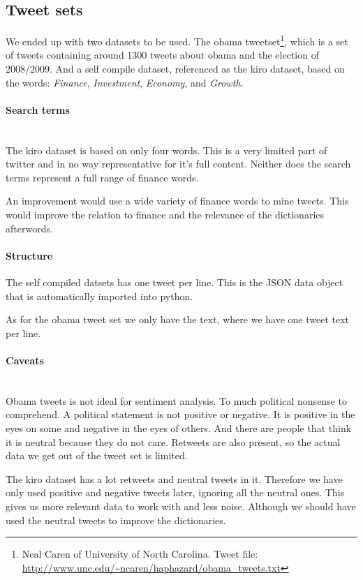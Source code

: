 \subsection{Tweet sets}
We ended up with two datasets to be used. The obama tweetset\footnote{Neal
Caren of University of North Carolina. Tweet file: \url{http://www.unc.edu/~ncaren/haphazard/obama_tweets.txt}}, which is a set of
tweets containing around 1300 tweets about obama and the election of 2008/2009.  
And a self compile dataset, referenced as the kiro dataset, based on the words: \textit{Finance},
\textit{Investment}, \textit{Economy}, and \textit{Growth}.

\paragraph{Search terms}
\hspace{0pt}\\
The kiro dataset is based on only four words. This is a very limited part of
twitter and in no way representative for it's full content. Neither does the
search terms represent a full range of finance words.

An improvement would use a wide variety of finance words to mine tweets. This
would improve the relation to finance and the relevance of the dictionaries
afterwords. 

\paragraph{Structure}
The self compiled datsets has one tweet per line. This is the JSON data object
that is automatically imported into python. 

As for the obama tweet set we only have the text, where we have one tweet text
per line. 

\paragraph{Caveats}
\hspace{0pt}\\
Obama tweets is not ideal for sentiment analysis. To much political nonsense to
comprehend. A political statement is not positive or negative. It is positive
in the eyes on some and negative in the eyes of others. And there are people
that think it is neutral because they do not care. Retweets are also present,
so the actual data we get out of the tweet set is limited. 

The kiro dataset has a lot retweets and neutral tweets in it. Therefore we have
only used positive and negative tweets later, ignoring all the neutral ones.
This gives us more relevant data to work with and less noise. Although we
should have used the neutral tweets to improve the dictionaries.
%

